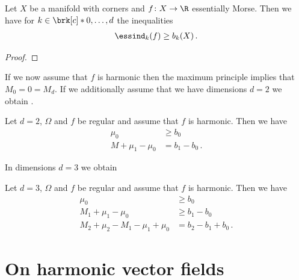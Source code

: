 \begin{corollary}
  Let $X$ be a manifold with corners and $f\colon X\to\R$ essentially Morse. Then we have for $k\in\brk[c]*{0,\dots,d}$
  the inequalities
  \begin{align*}
    \essind_k(f)\geq b_k(X)\,.
  \end{align*}
\end{corollary}
\begin{proof}
\end{proof}
If we now assume that $f$ is harmonic then the maximum principle implies that
$M_0=0=M_d$.
If we additionally assume that we have dimensions $d=2$ we obtain \cite[Corollary 10.1]{Morse1969}.
\begin{corollary}[Morse inequalities for $f$ harmonic, $d=2$]
  Let $d=2$, $\Omega$ and $f$ be regular and assume that $f$ is harmonic. Then we have
  \begin{align*}
    \mu_0&\geq b_0 \\
    M+\mu_1-\mu_0&=b_1-b_0\,.
  \end{align*}
\end{corollary}
In dimensions $d=3$ we obtain \cite[Corollary 10.2]{Morse1969}
\begin{corollary}[Morse inequalities for $f$ harmonic, $d=3$]
  Let $d=3$, $\Omega$ and $f$ be regular and assume that $f$ is harmonic. Then we have
  \begin{align*}
    \mu_0&\geq b_0 \\
    M_1+\mu_1-\mu_0&\geq b_1-b_0 \\
    M_2+\mu_2-M_1-\mu_1+\mu_0&= b_2-b_1+b_0\,.
  \end{align*}
\end{corollary}

\section{On harmonic vector fields}

